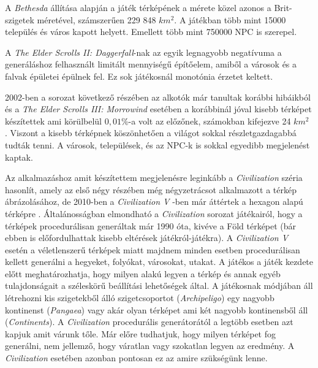 A \textit{Bethesda} állítása alapján a játék térképének a mérete közel azonos a Brit-szigetek méretével, számszerűen 229 848 $km^2$. A játékban több mint 15000 település és város kapott helyett. Emellett több mint 750000 NPC is szerepel. 

A \textit{The Elder Scrolls II: Daggerfall}-nak az egyik legnagyobb negatívuma a generáláshoz felhasznált limitált mennyiségű építőelem, amiből a városok és a falvak épületei épülnek fel. Ez sok játékosnál monotónia érzetet keltett. 

2002-ben a sorozat következő részében az alkotók már tanultak korábbi hibáikból és a \textit{The Elder Scrolls III: Morrowind} esetében a korábbinál jóval kisebb térképet készítettek ami körülbelül $0,01 \%$-a volt az előzőnek, számokban kifejezve 24 $km^2$ \cite{Daggerfall}. Viszont a kisebb térképnek köszönhetően a világot sokkal részletgazdagabbá tudták tenni. A városok, települések, és az NPC-k is sokkal egyedibb megjelenést kaptak.

Az alkalmazáshoz amit készítettem megjelenésre leginkább a \textit{Civilization} széria hasonlít, amely az első négy részében még négyzetrácsot alkalmazott a térkép ábrázolásához, de 2010-ben a \textit{Civilization V} -ben már áttértek a hexagon alapú térképre \cite{Civ1}. Általánosságban elmondható a \textit{Civilization} sorozat játékairól, hogy a térképek procedurálisan generáltak már 1990 óta, kivéve a Föld térképet (bár ebben is előfordulhattak kisebb eltérések játékról-játékra). A \textit{Civilization V} esetén a véletlenszerű térképek miatt majdnem minden esetben procedurálisan kellett generálni a hegyeket, folyókat, városokat, utakat. A játékos a játék kezdete előtt meghatározhatja, hogy milyen alakú legyen a térkép és annak egyéb tulajdonságait a széleskörű beállítási lehetőségek által. A játékosnak módjában áll létrehozni kis szigetekből álló szigetcsoportot (\textit{Archipeligo}) egy nagyobb kontinenst (\textit{Pangaea}) vagy akár olyan térképet ami két nagyobb kontinensből áll (\textit{Continents}). A \textit{Civilization} procedurális generátorától a legtöbb esetben azt kapjuk amit várunk tőle. Már előre tudhatjuk, hogy milyen térképet fog generálni, nem jellemző, hogy váratlan vagy szokatlan legyen az eredmény. A \textit{Civilization} esetében azonban pontosan ez az amire szükségünk lenne.

